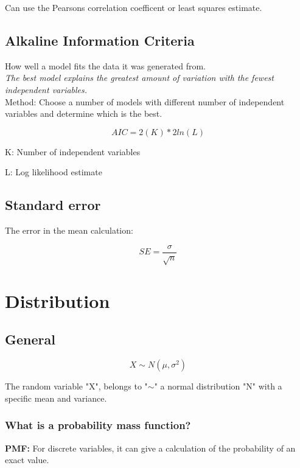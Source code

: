 \documentclass[11pt]{scrartcl} %
\begin{document}
Can use the Pearsons correlation coefficent or least squares estimate.

\subsection{Alkaline Information Criteria}

How well a model fits the data it was generated from.\\

\textit{The best model explains the greatest amount of variation with the fewest independent variables.}\\

Method: Choose a number of models with different number of independent variables and determine which is the best.

\begin{equation}
	AIC = 2(K) * 2ln(L)
\end{equation}

K: Number of independent variables

L: Log likelihood estimate

\subsection{Standard error}

The error in the mean calculation:

\[ SE = \frac{\sigma }{\sqrt{n}} \]

\section{Distribution}

\subsection{General}

\begin{equation}
	X \sim N(\mu,\sigma^2)
\end{equation}

The random variable "X", belongs to "\(\sim\)" a normal distribution "N" with a specific mean and variance.

\subsubsection{What is a probability mass function?}

\textbf{PMF:} For discrete variables, it can give a calculation of the probability of an exact value.
\end{document}
